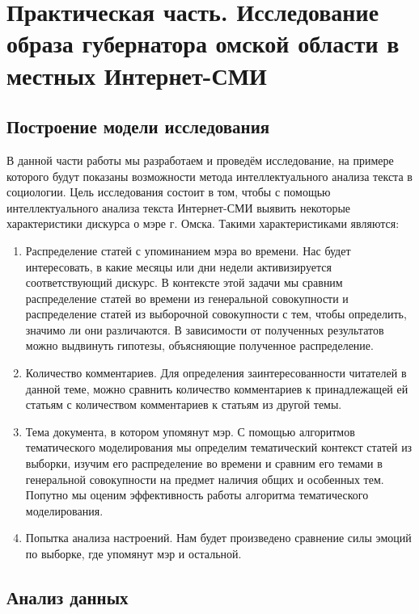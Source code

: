 \chapter{Практическая часть. Исследование образа губернатора омской области в местных Интернет-СМИ} \label{chapt2}
\section{Построение модели исследования} \label{sect2_1}
В данной части работы мы разработаем и проведём исследование, на примере которого будут показаны возможности метода интеллектуального анализа текста в социологии. Цель исследования состоит в том, чтобы с помощью интеллектуального анализа текста Интернет-СМИ выявить некоторые характеристики дискурса о мэре г. Омска. Такими характеристиками являются:
\begin{enumerate}
\item Распределение статей с упоминанием мэра во времени. Нас будет интересовать, в какие месяцы или дни недели активизируется соответствующий дискурс. В контексте этой задачи мы сравним распределение статей во времени из генеральной совокупности и распределение статей из выборочной совокупности с тем, чтобы определить, значимо ли они различаются. В зависимости от полученных результатов можно выдвинуть гипотезы, объясняющие полученное распределение.
\item Количество комментариев. Для определения заинтересованности читателей в данной теме, можно сравнить количество комментариев к принадлежащей ей статьям с количеством комментариев к статьям из другой темы.
\item Тема документа, в котором упомянут мэр. С помощью алгоритмов тематического моделирования мы определим тематический контекст статей из выборки, изучим его распределение во времени и сравним его темами в генеральной совокупности на предмет наличия общих и особенных тем. Попутно мы оценим эффективность работы алгоритма тематического моделирования. %
\item Попытка анализа настроений. Нам будет произведено сравнение силы эмоций по выборке, где упомянут мэр и остальной.
\end{enumerate}
\section{Анализ данных} \label{sect2_2}



\clearpage